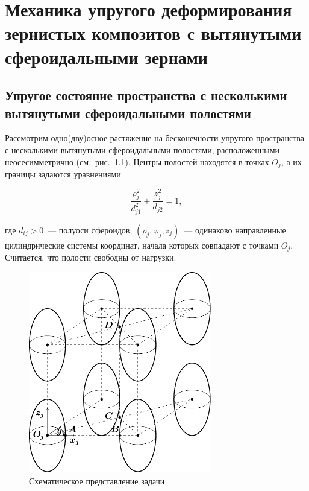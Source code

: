 
\chapter{Механика упругого деформирования зернистых композитов с вытянутыми сфероидальными зернами}

\section{Упругое состояние пространства с несколькими вытянутыми сфероидальными полостями}


Рассмотрим одно(дву)осное растяжение на бесконечности упругого пространства с несколькими вытянутыми сфероидальными полостями, расположенными неосесимметрично (см.~рис.~\ref{f:9:1}). Центры полостей находятся в точках $O_j$, а их границы задаются уравнениями

\begin{equation}
\frac{{\rho _j^2}}{{d_{j1}^2}} + \frac{{z_j^2}}{{{d_{j2}}}} = 1,
\end{equation}

\noindent где $d_{ij}>0$~--- полуоси сфероидов; $(\rho_j,\varphi_j,z_j)$~--- одинаково направленные цилиндрические системы координат, начала которых совпадают с точками $O_j$. Считается, что полости свободны от нагрузки.

\begin{figure}[h!]
\centering
\includegraphics[width=8cm]{cartesian-spheroids.pdf}
\caption{Схематическое представление задачи}
\label{f:9:1}
\end{figure}

